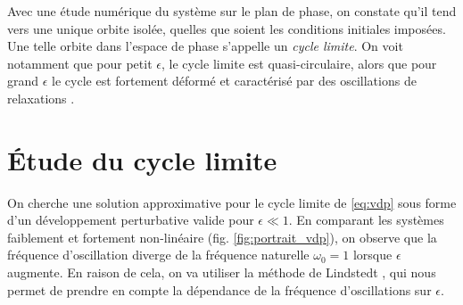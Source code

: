 %
%
Avec une étude numérique du système sur le plan de phase, on constate qu'il tend vers une unique orbite isolée, quelles que soient les conditions initiales imposées. 
Une telle orbite dans l'espace de phase s'appelle un \emph{cycle limite}. On voit notamment que pour petit $\epsilon$, le cycle limite est quasi-circulaire, 
alors que pour grand $\epsilon$ le cycle est fortement déformé et caractérisé par des oscillations de relaxations \cite{rand_lecture_2012}.
%
\section{Étude du cycle limite}
%
On cherche une solution approximative pour le cycle limite de \eqref{eq:vdp} sous forme d'un développement perturbative valide pour $\epsilon \ll 1$. 
En comparant les systèmes faiblement et fortement non-linéaire (fig. \ref{fig:portrait_vdp}), on observe que la fréquence d'oscillation diverge de la fréquence naturelle $\omega_0 = 1$ lorsque $\epsilon$ augmente. 
En raison de cela, on va utiliser la méthode de Lindstedt \cite{rand_lecture_2012}, 
qui nous permet de prendre en compte la dépendance de la fréquence d'oscillations sur $\epsilon$. 

